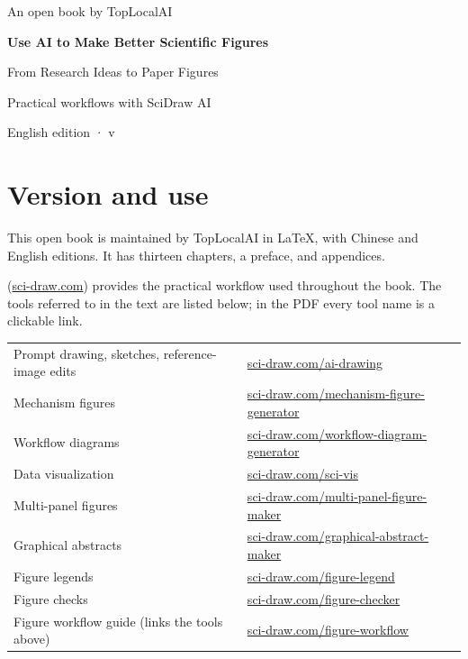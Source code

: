 \documentclass[11pt,openany]{book}
\begin{document}

\begin{titlepage}
\color{BookInk}
\vspace*{18mm}
{\sffamily\large An open book by TopLocalAI\par}
\vspace{18mm}
{\Huge\bfseries Use AI to Make Better Scientific Figures\par}
\vspace{8mm}
{\Large From Research Ideas to Paper Figures\par}
\vspace{14mm}
{\large Practical workflows with SciDraw AI\par}
\vfill
{\large English edition · v\bookversion\par}
\vspace{3mm}
{\normalsize \bookdate\par}
\vspace{8mm}
\end{titlepage}
\frontmatter
\chapter*{Version and use}
This open book is maintained by TopLocalAI in LaTeX, with Chinese and English editions. It has thirteen chapters, a preface, and appendices.

\scidraw{} (\href{https://sci-draw.com}{sci-draw.com}) provides the practical workflow used throughout the book. The tools referred to in the text are listed below; in the PDF every tool name is a clickable link.

\begin{center}\small
\begin{tabular}{@{}ll@{}}
Prompt drawing, sketches, reference-image edits & \href{https://sci-draw.com/ai-drawing}{sci-draw.com/ai-drawing}\\
Mechanism figures & \href{https://sci-draw.com/mechanism-figure-generator}{sci-draw.com/mechanism-figure-generator}\\
Workflow diagrams & \href{https://sci-draw.com/workflow-diagram-generator}{sci-draw.com/workflow-diagram-generator}\\
Data visualization & \href{https://sci-draw.com/sci-vis}{sci-draw.com/sci-vis}\\
Multi-panel figures & \href{https://sci-draw.com/multi-panel-figure-maker}{sci-draw.com/multi-panel-figure-maker}\\
Graphical abstracts & \href{https://sci-draw.com/graphical-abstract-maker}{sci-draw.com/graphical-abstract-maker}\\
Figure legends & \href{https://sci-draw.com/figure-legend}{sci-draw.com/figure-legend}\\
Figure checks & \href{https://sci-draw.com/figure-checker}{sci-draw.com/figure-checker}\\
Figure workflow guide (links the tools above) & \href{https://sci-draw.com/figure-workflow}{sci-draw.com/figure-workflow}\\
\end{tabular}
\end{center}
\end{document}
